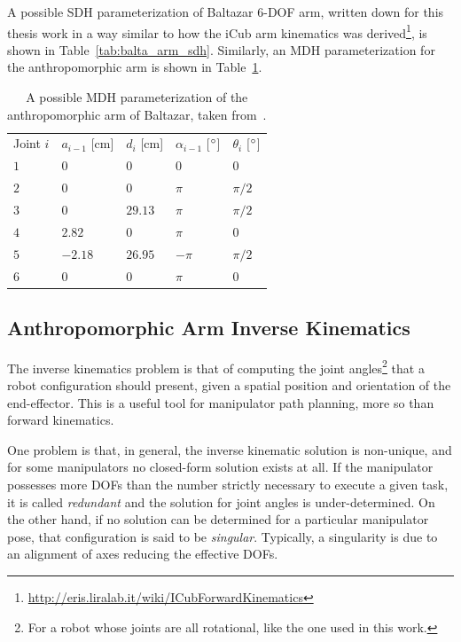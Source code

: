 A possible \ac{SDH} parameterization of Baltazar 6-\acs{DOF} arm, written down for this thesis work in a way similar to how the iCub arm kinematics was derived\footnote{\url{http://eris.liralab.it/wiki/ICubForwardKinematics}}, is shown in Table~\ref{tab:balta_arm_sdh}. Similarly, an \ac{MDH} parameterization for the anthropomorphic arm is shown in Table~\ref{tab:balta_arm_mdh}.

\begin{table}
\caption[\acs{MDH} parameters of Baltazar anthropomorphic arm]{A possible \ac{MDH} parameterization of the anthropomorphic arm of Baltazar, taken from~\cite{lopes:2004}.}
\label{tab:balta_arm_mdh}
\centering
\medskip
\begin{tabular}{*{5}{l}} %
\toprule
Joint $i$ & $a_{i-1}$ [cm] & $d_i$ [cm]& $\alpha_{i-1}$ [$^\circ$] & $\theta_i$ [$^\circ$] \\
\otoprule
$1$ & $0$ & $0$ & $0$ & $0$ \\
\midrule
$2$ & $0$ & $0$ & $\pi$ & $\pi/2$ \\
\midrule
$3$ & $0$ & $29.13$ & $\pi$ & $\pi/2$ \\
\midrule
$4$ & $2.82$ & $0$ & $\pi$ & $0$ \\
\midrule
$5$ & $-2.18$ & $26.95$ & $-\pi$ & $\pi/2$ \\
\midrule
$6$ & $0$ & $0$ & $\pi$ & $0$ \\
\bottomrule
\end{tabular}
\end{table}



\subsection{Anthropomorphic Arm Inverse Kinematics}
\label{sec:balta_arm_inv_kin}

The inverse kinematics problem is that of computing the joint angles\footnote{For a robot whose joints are all rotational, like the one used in this work.} that a robot configuration should present, given a spatial position and orientation of the end-effector. This is a useful tool for manipulator path planning, more so than forward kinematics.

One problem is that, in general, the inverse kinematic solution is non-unique, and for some manipulators no closed-form solution exists at all. If the manipulator possesses more \acp{DOF} than the number strictly necessary to execute a given task, it is called \emph{redundant} and the solution for joint angles is under-determined. On the other hand, if no solution can be determined for a particular manipulator pose, that configuration is said to be \emph{singular}. Typically, a singularity is due to an alignment of axes reducing the effective \acp{DOF}.

